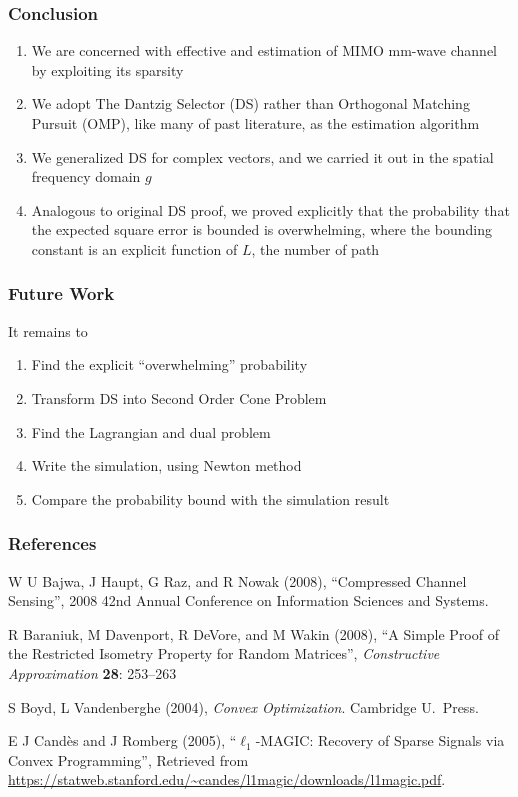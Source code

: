 \documentclass{beamer}
\newcounter{countRef}
\newcommand{\I}{\item}
\begin{document}
\begin{frame}
\frametitle{Conclusion}
\begin{enumerate}
\I We are concerned with effective and estimation of MIMO mm-wave channel by exploiting its sparsity
\I We adopt The Dantzig Selector (DS) rather than Orthogonal Matching Pursuit (OMP), like many of past literature, as the estimation algorithm
\I We generalized DS for complex vectors, and we carried it out in the spatial frequency domain \(g\)
\I Analogous to original DS proof, we proved explicitly that the probability that the expected square error is bounded is overwhelming, where the bounding constant is an explicit function of \(L\), the number of path
\end{enumerate}
\end{frame}

\begin{frame}
\frametitle{Future Work}
It remains to
\begin{enumerate}
\I Find the explicit ``overwhelming'' probability
\I Transform DS into Second Order Cone Problem
\I Find the Lagrangian and dual problem
\I Write the simulation, using Newton method
\I Compare the probability bound with the simulation result
\end{enumerate}
\end{frame}


\begin{frame}
\frametitle{References}
\begin{enumerate}
{ \small
\I W U Bajwa, J Haupt, G Raz, and R Nowak (2008), ``Compressed Channel Sensing'', 2008 42nd Annual Conference on Information Sciences and Systems.
\I R Baraniuk, M Davenport, R DeVore, and M Wakin (2008), ``A Simple Proof of the Restricted Isometry Property for Random Matrices'', \textit{Constructive Approximation} \textbf{28}: 253–263
\I S Boyd, L Vandenberghe (2004), \textit{Convex Optimization}. Cambridge U.\ Press.
\I E J Cand\`es and J Romberg (2005), ``\(\ell_1\)-MAGIC: Recovery of Sparse Signals via Convex Programming'', Retrieved from \url{https://statweb.stanford.edu/~candes/l1magic/downloads/l1magic.pdf}.
}
\setcounter{countRef}{\value{enumi}}
\end{enumerate}
\end{frame}
\end{document}
